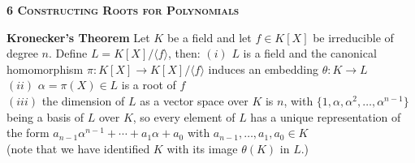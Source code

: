 \documentclass[a4paper]{article}
\begin{document}
\begin{framed}
	\begin{center}
		\textbf{\textsc{6 Constructing Roots for Polynomials}}
	\end{center}
	\textbf{Kronecker's Theorem} Let $K$ be a field and let $f \in K[X]$ be irreducible of degree $n$. Define $L = K[X] / \langle f \rangle$, then:
	$(i)$ $L$ is a field and the canonical homomorphism $\pi : K[X] \rightarrow K[X] / \langle f \rangle$ induces an embedding $\theta: K \rightarrow L$\\
	$(ii)$ $\alpha = \pi(X) \in L$ is a root of $f$\\
	$(iii)$ the dimension of $L$ as a vector space over $K$ is $n$, with $\{1, \alpha, \alpha^2, \dots, \alpha^{n-1}\}$ being a basis of $L$ over $K$, so every element of $L$ has a unique representation of the form $a_{n-1}\alpha^{n-1} + \cdots + a_1\alpha + a_0$ with $a_{n-1}, \dots, a_1, a_0 \in K$\\
	(note that we have identified $K$ with its image $\theta(K)$ in $L$.)
\end{framed}
\end{document}
